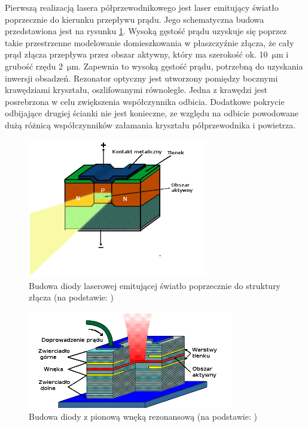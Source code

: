 \documentclass[a4paper,10pt,twoside]{article}
\begin{document}
Pierwszą realizacją lasera półprzewodnikowego jest laser emitujący światło poprzecznie do kierunku przepływu prądu. Jego schematyczna budowa przedstawiona jest na rysunku \ref{rys-eel}. Wysoką gęstość prądu uzyskuje się poprzez takie przestrzenne modelowanie domieszkowania w płaszczyźnie złącza, że cały prąd złącza przepływa przez obszar aktywny, który ma szerokość ok. 10~$\mathrm{\mu m}$ i grubość rzędu 2~$\mathrm{\mu m}$. Zapewnia to wysoką gęstość prądu, potrzebną do uzyskania inwersji obsadzeń. Rezonator optyczny jest utworzony pomiędzy bocznymi krawędziami kryształu, oszlifowanymi równolegle. Jedna z krawędzi jest posrebrzona w celu zwiększenia współczynnika odbicia. Dodatkowe pokrycie odbijające drugiej ścianki nie jest konieczne, ze względu na odbicie powodowane dużą różnicą współczynników załamania kryształu półprzewodnika i powietrza.

\begin{figure}
\begin{center}
 \includegraphics[width=0.7\textwidth]{./obrazki/rys-eel.png}
\end{center}
\caption{Budowa diody laserowej emitującej światło poprzecznie do struktury złącza (na podstawie: \cite{rys-laserki})}
\label{rys-eel}
\end{figure}


\begin{figure}
\begin{center}
 \includegraphics[width=0.8\textwidth]{./obrazki/rys-vcsel.png}
\end{center}
\caption{Budowa diody z pionową wnęką rezonansową (na podstawie: \cite{rys-laserki})}
\label{rys-vcsel}
\end{figure}
\end{document}
